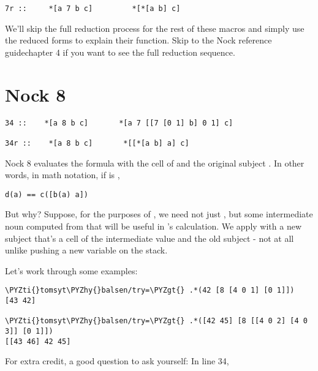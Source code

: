 \begin{framed_shaded}
\begin{Verbatim}[fontsize=\relsize{-2.5},commandchars=\\\{\}]
7r ::     *[a 7 b c]         *[*[a b] c]
\end{Verbatim}
\end{framed_shaded}
We'll skip the full reduction process for the rest of these macros and simply use the reduced forms to explain their function. Skip to the Nock reference guidechapter 4 if you want to see the full reduction sequence.

\section{Nock 8}

\begin{framed_shaded}
\begin{Verbatim}[fontsize=\relsize{-2.5},commandchars=\\\{\}]
34 ::    *[a 8 b c]       *[a 7 [[7 [0 1] b] 0 1] c]

34r ::    *[a 8 b c]       *[[*[a b] a] c]
\end{Verbatim}
\end{framed_shaded}

Nock 8 evaluates the formula  with the cell of \kode{*[a b]} and the original
subject .  In other words, in math notation, if  is \kode{[8 b c]},

\begin{framed_shaded}
\begin{Verbatim}[fontsize=\relsize{-2.5},commandchars=\\\{\}]
d(a) == c([b(a) a])
\end{Verbatim}
\end{framed_shaded}
But why?  Suppose, for the purposes of , we need not just ,
but some intermediate noun computed from  that will be useful
in 's calculation.  We apply  with a new subject that's a
cell of the intermediate value and the old subject - not at all
unlike pushing a new variable on the stack.

Let's work through some examples:

\begin{framed_shaded}
\begin{Verbatim}[fontsize=\relsize{-2.5},commandchars=\\\{\}]
\PYZti{}tomsyt\PYZhy{}balsen/try=\PYZgt{} .*(42 [8 [4 0 1] [0 1]])
[43 42]

\PYZti{}tomsyt\PYZhy{}balsen/try=\PYZgt{} .*([42 45] [8 [[4 0 2] [4 0 3]] [0 1]])
[[43 46] 42 45]
\end{Verbatim}
\end{framed_shaded}
For extra credit, a good question to ask yourself: In line 34,

